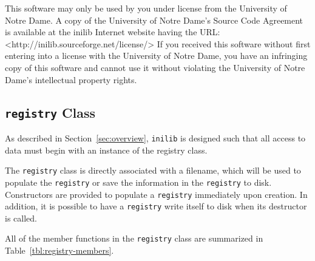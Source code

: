 %
This software may only be used by you under license from the
University of Notre Dame.  A copy of the University of Notre Dame's
Source Code Agreement is available at the inilib Internet website
having the URL: <http://inilib.sourceforge.net/license/> If you
received this software without first entering into a license with the
University of Notre Dame, you have an infringing copy of this software
and cannot use it without violating the University of Notre Dame's
intellectual property rights.
% 
%

\subsection[registry Class]{{\tt registry} Class}
\label{sec:registry}

As described in Section~\ref{sec:overview}, {\tt inilib} is designed
such that all access to data must begin with an instance of the
registry class.  

The {\tt registry} class is directly associated with a filename, which
will be used to populate the {\tt registry} or save the information in
the {\tt registry} to disk.  Constructors are provided to populate a
{\tt registry} immediately upon creation.  In addition, it is possible
to have a {\tt registry} write itself to disk when its destructor is
called.

All of the member functions in the {\tt registry} class are summarized
in Table~\ref{tbl:registry-members}.


